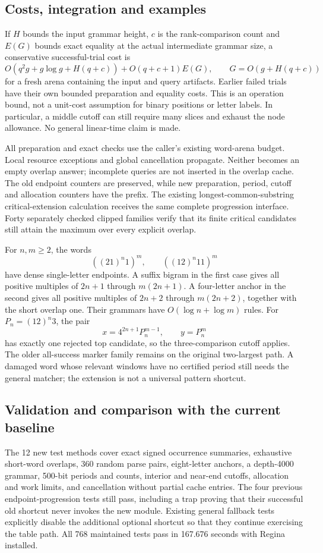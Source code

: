 \subsection{Costs, integration and examples}
If $H$ bounds the input grammar height, $c$ is the rank-comparison count and
$E(G)$ bounds exact equality at the actual intermediate grammar size, a
conservative successful-trial cost is
\[
 O(q^2g+g\log g+H(q+c))+O(q+c+1)E(G),
 \qquad G=O(g+H(q+c))
\]
for a fresh arena containing the input and query artifacts. Earlier failed
trials have their own bounded preparation and equality costs. This is an
operation bound, not a unit-cost assumption for binary positions or letter
labels. In particular, a middle cutoff can still require many slices and
exhaust the node allowance. No general linear-time claim is made.

All preparation and exact checks use the caller's existing word-arena budget.
Local resource exceptions and global cancellation propagate. Neither becomes
an empty overlap answer; incomplete queries are not inserted in the overlap
cache. The old endpoint counters are preserved, while new preparation,
period, cutoff and allocation counters have the  prefix.
The existing longest-common-substring critical-extension calculation receives
the same complete progression interface. Forty separately checked clipped
families verify that its finite critical candidates still attain the maximum
over every explicit overlap.

For $n,m\ge2$, the words
\[
 ((21)^n1)^m,\qquad ((12)^n11)^m
\]
have dense single-letter endpoints. A suffix bigram in the first case gives
all positive multiples of $2n+1$ through $m(2n+1)$. A four-letter anchor in
the second gives all positive multiples of $2n+2$ through $m(2n+2)$, together
with the short overlap one. Their grammars have $O(\log n+\log m)$ rules.
For $P_n=(12)^n3$, the pair
\[
 x=4^{2n+1}P_n^{m-1},\qquad y=P_n^m
\]
has exactly one rejected top candidate, so the three-comparison cutoff applies.
The older all-success marker family remains on the original two-largest path.
A damaged word whose relevant windows have no certified period still needs
the general matcher; the extension is not a universal pattern shortcut.

\subsection{Validation and comparison with the current baseline}
The 12 new test methods cover exact signed occurrence summaries, exhaustive
short-word overlaps, 360 random parse pairs, eight-letter anchors, a depth-4000
grammar, 500-bit periods and counts, interior and near-end cutoffs, allocation
and work limits, and cancellation without partial cache entries. The four
previous endpoint-progression tests still pass, including a trap proving that
their successful old shortcut never invokes the new module. Existing general
fallback tests explicitly disable the additional optional shortcut so that
they continue exercising the table path. All 768 maintained tests pass in
167.676 seconds with Regina installed.

